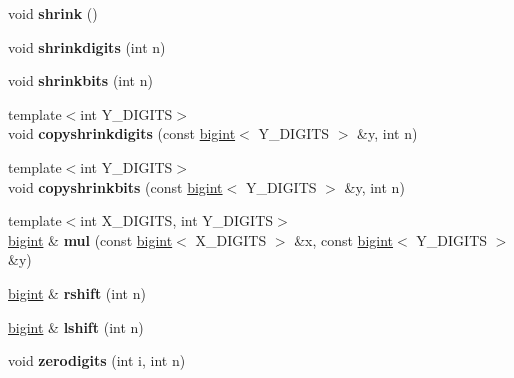\begin{DoxyCompactItemize}
\mbox{\label{structbigint_a38a2d634b288f4c23f406bcb794de22b}} 
void {\bfseries shrink} ()
\item 
\mbox{\label{structbigint_a1cc3b88393338ca9c1813d36b4636601}} 
void {\bfseries shrinkdigits} (int n)
\item 
\mbox{\label{structbigint_a3498ee3a712c2057a900217ffc9e39fa}} 
void {\bfseries shrinkbits} (int n)
\item 
\mbox{\label{structbigint_a02338caddb7028e53afe0d463a1ad436}} 
{\footnotesize template$<$int Y\+\_\+\+D\+I\+G\+I\+TS$>$ }\\void {\bfseries copyshrinkdigits} (const \hyperlink{structbigint}{bigint}$<$ Y\+\_\+\+D\+I\+G\+I\+TS $>$ \&y, int n)
\item 
\mbox{\label{structbigint_a9cc3c9a99a3b52b9da27500514f22bfa}} 
{\footnotesize template$<$int Y\+\_\+\+D\+I\+G\+I\+TS$>$ }\\void {\bfseries copyshrinkbits} (const \hyperlink{structbigint}{bigint}$<$ Y\+\_\+\+D\+I\+G\+I\+TS $>$ \&y, int n)
\item 
\mbox{\label{structbigint_a916fbb1ce43a8dff864d90452890b91e}} 
{\footnotesize template$<$int X\+\_\+\+D\+I\+G\+I\+TS, int Y\+\_\+\+D\+I\+G\+I\+TS$>$ }\\\hyperlink{structbigint}{bigint} \& {\bfseries mul} (const \hyperlink{structbigint}{bigint}$<$ X\+\_\+\+D\+I\+G\+I\+TS $>$ \&x, const \hyperlink{structbigint}{bigint}$<$ Y\+\_\+\+D\+I\+G\+I\+TS $>$ \&y)
\item 
\mbox{\label{structbigint_a0a11867c8ff9b0f2ab796fe25b5f4733}} 
\hyperlink{structbigint}{bigint} \& {\bfseries rshift} (int n)
\item 
\mbox{\label{structbigint_a160aacfae19cfa773b89a1fb3c8b033f}} 
\hyperlink{structbigint}{bigint} \& {\bfseries lshift} (int n)
\item 
\mbox{\label{structbigint_ae14cecc50be88164a6b84456cbd0d600}} 
void {\bfseries zerodigits} (int i, int n)
\item 
\mbox{\label{structbigint_a97bf226c66e0b6ed908910997f7c4461}} 

\end{DoxyCompactItemize}
